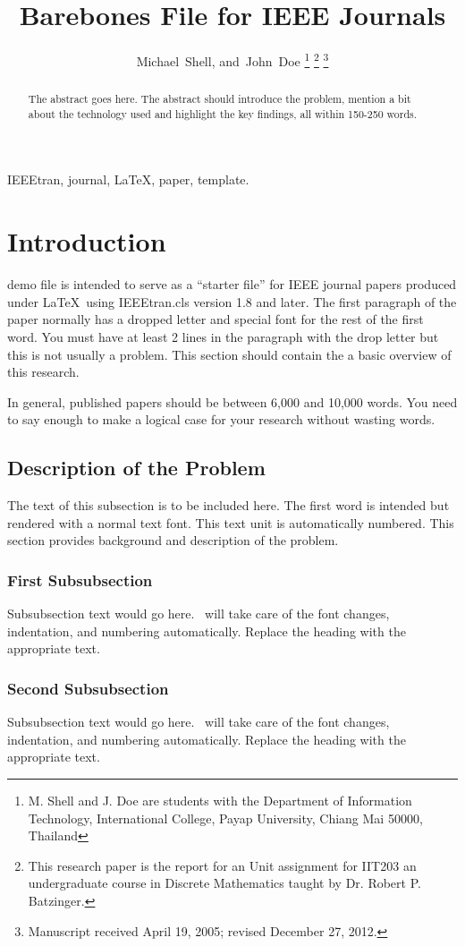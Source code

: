 \documentclass[journal,12pt]{IEEEtran}
\title{Barebones File for IEEE Journals}
\author{Michael~Shell,
        and~John~Doe%
\thanks{M. Shell and J. Doe are students with the Department of Information Technology, International College, Payap University, Chiang Mai 50000, Thailand}%
\thanks{This research paper is the report for an Unit assignment for IIT203 an undergraduate course in Discrete Mathematics taught by Dr. Robert P. Batzinger.}%
\thanks{Manuscript received  April 19, 2005; revised December 27, 2012.}}
\begin{document}
\maketitle

\begin{abstract}
The abstract goes here. The abstract should introduce the problem, mention a bit about the technology used and highlight the key findings, all within 150-250 words.
\end{abstract}

\begin{IEEEkeywords}
IEEEtran, journal, \LaTeX, paper, template.
\end{IEEEkeywords}

\section{Introduction}

 demo file is intended to serve as a ``starter file''
for IEEE journal papers produced under \LaTeX\ using
IEEEtran.cls version 1.8 and later. The first paragraph of the paper normally has a dropped letter and special font for the rest of the first word.
You must have at least 2 lines in the paragraph with the drop letter but this is not usually a problem. This section should contain the a basic overview of this research.\cite{Kopka:2003}

In general, published papers should be between 6,000 and 10,000 words. You need to say enough to make a logical case for your research without wasting words. 

\subsection{Description of the Problem}
The text of this subsection is to be included here. The first word is intended but rendered with a normal text font. This text unit is automatically numbered. This section provides background and description of the problem. 

\subsubsection{First Subsubsection}
Subsubsection text would go here. \LaTeXe\ will take care of the font changes, indentation, and numbering automatically. Replace the heading with the appropriate text.

\subsubsection{Second Subsubsection}
Subsubsection text would go here. \LaTeXe\ will take care of the font changes, indentation, and numbering automatically. Replace the heading with the appropriate text.
\end{document}
